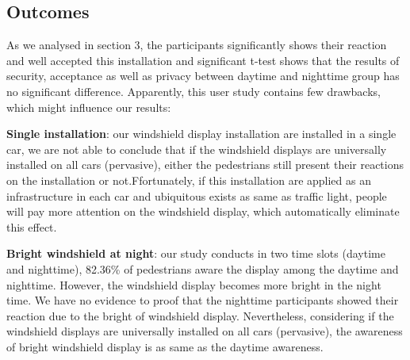 \subsection{Outcomes}
As we analysed in section 3,  the participants significantly shows their reaction and well accepted this installation and significant t-test shows that the results of security, acceptance as well as privacy between daytime and nighttime group has no significant difference. Apparently, this user study contains few drawbacks, which might influence our results:

\textbf{Single installation}: our windshield display installation are installed in a single car, we are not able to conclude that if the windshield displays are universally installed on all cars
(pervasive), either the pedestrians still present their reactions on the installation or not.Ffortunately, if this installation are applied as an infrastructure in each car and ubiquitous exists as same as traffic light, people will pay more attention on the windshield display, which automatically eliminate this effect.

\textbf{Bright windshield at night}: our study conducts in two time slots (daytime and nighttime), 82.36\% of pedestrians aware the display among the daytime and nighttime. However, the windshield display becomes more bright in the night time. We have no evidence to proof that the nighttime participants showed their reaction due to the bright of windshield display. Nevertheless, considering if the windshield displays are universally installed on all cars (pervasive), the awareness of bright windshield display is as same as the daytime awareness.